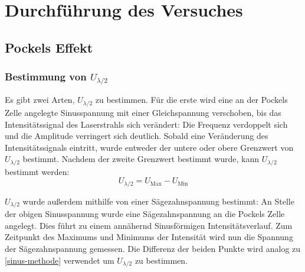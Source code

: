 \section{Durchführung des Versuches}
\subsection{Pockels Effekt}
\subsubsection{Bestimmung von $U_{\lambda/2}$}
Es gibt zwei Arten, $U_{\lambda /2}$ zu bestimmen. Für die erste wird eine an der Pockels Zelle angelegte Sinusspannung mit einer Gleichspannung verschoben, bis das Intensitätssignal des Laserstrahls sich verändert: Die Frequenz verdoppelt sich und die Amplitude verringert sich deutlich. Sobald eine Veränderung des Intensitätssignals eintritt, wurde entweder der untere oder obere Grenzwert von $U_{\lambda/2}$ bestimmt. Nachdem der zweite Grenzwert bestimmt wurde, kann $U_{\lambda/2}$ bestimmt werden:
\begin{equation}\label{sinus-methode}
U_{\lambda/2} = U_{\textrm{Max}} - U_{\textrm{Min}}
\end{equation}

$U_{\lambda/2}$ wurde außerdem mithilfe von einer Sägezahnspannung bestimmt: An Stelle der obigen Sinusspannung wurde eine Sägezahnspannung an die Pockels Zelle angelegt. Dies führt zu einem annähernd Sinusförmigen Intensitätsverlauf. Zum Zeitpunkt des Maximums und Minimums der Intensität wird nun die Spannung der Sägezahnspannung gemessen. Die Differenz der beiden Punkte wird analog zu \ref{sinus-methode} verwendet um $U_{\lambda/2}$ zu bestimmen.